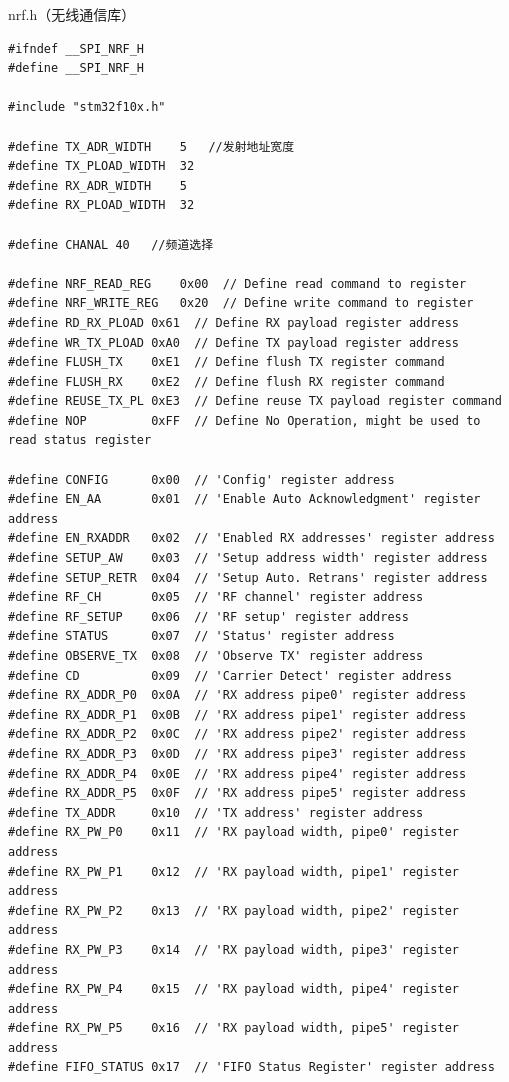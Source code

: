 \documentclass[UTF8,a4paper,11pt]{article}
\begin{document}
nrf.h（无线通信库）
\begin{lstlisting}[caption={}]
#ifndef __SPI_NRF_H
#define __SPI_NRF_H

#include "stm32f10x.h"

#define TX_ADR_WIDTH 	5  	//发射地址宽度
#define TX_PLOAD_WIDTH  32   
#define RX_ADR_WIDTH    5
#define RX_PLOAD_WIDTH  32 

#define CHANAL 40	//频道选择 

#define NRF_READ_REG    0x00  // Define read command to register
#define NRF_WRITE_REG   0x20  // Define write command to register
#define RD_RX_PLOAD 0x61  // Define RX payload register address
#define WR_TX_PLOAD 0xA0  // Define TX payload register address
#define FLUSH_TX    0xE1  // Define flush TX register command
#define FLUSH_RX    0xE2  // Define flush RX register command
#define REUSE_TX_PL 0xE3  // Define reuse TX payload register command
#define NOP         0xFF  // Define No Operation, might be used to read status register

#define CONFIG      0x00  // 'Config' register address
#define EN_AA       0x01  // 'Enable Auto Acknowledgment' register address
#define EN_RXADDR   0x02  // 'Enabled RX addresses' register address
#define SETUP_AW    0x03  // 'Setup address width' register address
#define SETUP_RETR  0x04  // 'Setup Auto. Retrans' register address
#define RF_CH       0x05  // 'RF channel' register address
#define RF_SETUP    0x06  // 'RF setup' register address
#define STATUS      0x07  // 'Status' register address
#define OBSERVE_TX  0x08  // 'Observe TX' register address
#define CD          0x09  // 'Carrier Detect' register address
#define RX_ADDR_P0  0x0A  // 'RX address pipe0' register address
#define RX_ADDR_P1  0x0B  // 'RX address pipe1' register address
#define RX_ADDR_P2  0x0C  // 'RX address pipe2' register address
#define RX_ADDR_P3  0x0D  // 'RX address pipe3' register address
#define RX_ADDR_P4  0x0E  // 'RX address pipe4' register address
#define RX_ADDR_P5  0x0F  // 'RX address pipe5' register address
#define TX_ADDR     0x10  // 'TX address' register address
#define RX_PW_P0    0x11  // 'RX payload width, pipe0' register address
#define RX_PW_P1    0x12  // 'RX payload width, pipe1' register address
#define RX_PW_P2    0x13  // 'RX payload width, pipe2' register address
#define RX_PW_P3    0x14  // 'RX payload width, pipe3' register address
#define RX_PW_P4    0x15  // 'RX payload width, pipe4' register address
#define RX_PW_P5    0x16  // 'RX payload width, pipe5' register address
#define FIFO_STATUS 0x17  // 'FIFO Status Register' register address


\end{lstlisting}
\end{document}
